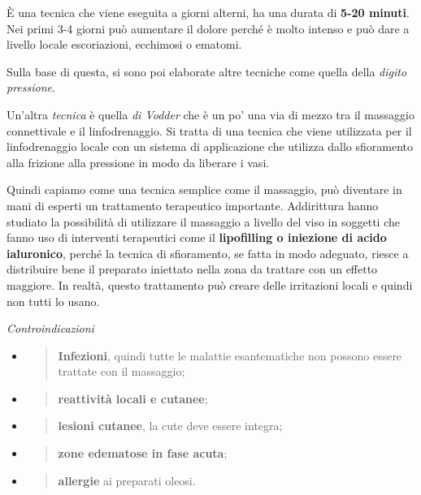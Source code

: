 \documentclass[]{article}
\begin{document}
È una tecnica che viene eseguita a giorni alterni, ha una durata di
\textbf{5-20 minuti}. Nei primi 3-4 giorni può aumentare il dolore
perché è molto intenso e può dare a livello locale escoriazioni,
ecchimosi o ematomi.

Sulla base di questa, si sono poi elaborate altre tecniche come quella
della \emph{digito pressione}.

Un'altra \emph{tecnica} è quella \emph{di Vodder} che è un po' una via
di mezzo tra il massaggio connettivale e il linfodrenaggio. Si tratta di
una tecnica che viene utilizzata per il linfodrenaggio locale con un
sistema di applicazione che utilizza dallo sfioramento alla frizione
alla pressione in modo da liberare i vasi.

Quindi capiamo come una tecnica semplice come il massaggio, può
diventare in mani di esperti un trattamento terapeutico importante.
Addirittura hanno studiato la possibilità di utilizzare il massaggio a
livello del viso in soggetti che fanno uso di interventi terapeutici
come il \textbf{lipofilling o iniezione di acido ialuronico}, perché la
tecnica di sfioramento, se fatta in modo adeguato, riesce a distribuire
bene il preparato iniettato nella zona da trattare con un effetto
maggiore. In realtà, questo trattamento può creare delle irritazioni
locali e quindi non tutti lo usano.

\emph{Controindicazioni}

\begin{itemize}
\item
  \begin{quote}
  \textbf{Infezioni}, quindi tutte le malattie esantematiche non possono
  essere trattate con il massaggio;
  \end{quote}
\item
  \begin{quote}
  \textbf{reattività locali e cutanee};
  \end{quote}
\item
  \begin{quote}
  \textbf{lesioni cutanee}, la cute deve essere integra;
  \end{quote}
\item
  \begin{quote}
  \textbf{zone edematose in fase acuta};
  \end{quote}
\item
  \begin{quote}
  \textbf{allergie} ai preparati oleosi.
  \end{quote}
\end{itemize}
\end{document}
